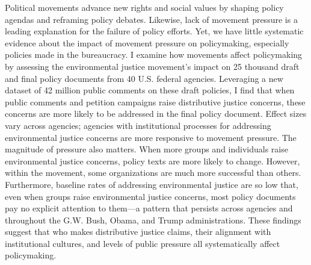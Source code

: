 Political movements advance new rights and social values by shaping policy agendas and reframing policy debates. Likewise, lack of movement pressure is a leading explanation for the failure of policy efforts. Yet, we have little systematic evidence about the impact of movement pressure on policymaking, especially policies made in the bureaucracy. I examine how movements affect policymaking by assessing the environmental justice movement's impact on 25 thousand draft and final policy documents from 40 U.S. federal agencies. Leveraging a new dataset of 42 million public comments on these draft policies, I find that when public comments and petition campaigns raise distributive justice concerns, these concerns are more likely to be addressed in the final policy document. Effect sizes vary across agencies; agencies with institutional processes for addressing environmental justice concerns are more responsive to movement pressure. The magnitude of pressure also matters. When more groups and individuals raise environmental justice concerns, policy texts are more likely to change. However, within the movement, some organizations are much more successful than others. Furthermore, baseline rates of addressing environmental justice are so low that, even when groups raise environmental justice concerns, most policy documents pay no explicit attention to them---a pattern that persists across agencies and throughout the G.W. Bush, Obama, and Trump administrations. These findings suggest that who makes distributive justice claims, their alignment with institutional cultures, and levels of public pressure all systematically affect policymaking.